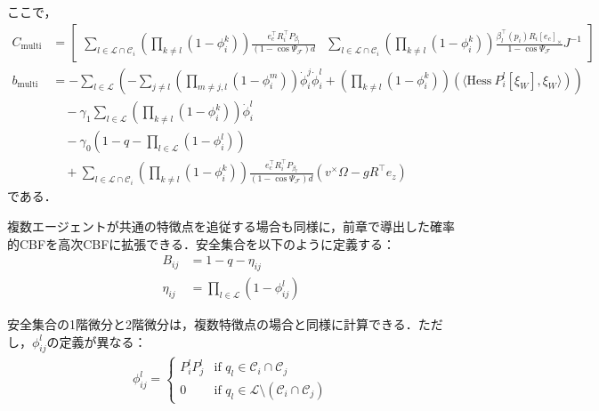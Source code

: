 ここで，
\begin{equation}
\begin{aligned}
C_{\mathrm{multi}} &= \begin{bmatrix}
\sum_{l \in \mathcal{L} \cap \mathcal{C}_i} \left(\prod_{k \neq l} (1 - \phi_i^k)\right) \frac{e_c^\top R_i^\top P_{\beta_l}}{(1 - \cos\Psi_{\mathcal{F}}) d} & \sum_{l \in \mathcal{L} \cap \mathcal{C}_i} \left(\prod_{k \neq l} (1 - \phi_i^k)\right) \frac{\beta_l^\top(p_i) R_i [e_c]_\times}{1 - \cos\Psi_{\mathcal{F}}} J^{-1}
\end{bmatrix} \\
b_{\mathrm{multi}} &= -\sum_{l \in \mathcal{L}} \left(-\sum_{j \neq l} \left(\prod_{m \neq j, l} (1 - \phi_i^m)\right) \dot{\phi}_i^j \dot{\phi}_i^l + \left(\prod_{k \neq l} (1 - \phi_i^k)\right) (\langle \mathrm{Hess}\:P_i^l[\xi_W], \xi_W \rangle)\right) \\
&\quad - \gamma_1 \sum_{l \in \mathcal{L}} \left(\prod_{k \neq l} (1 - \phi_i^k)\right) \dot{\phi}_i^l \\
&\quad - \gamma_0 (1 - q - \prod_{l \in \mathcal{L}} (1 - \phi_i^l)) \\
&\quad + \sum_{l \in \mathcal{L} \cap \mathcal{C}_i} \left(\prod_{k \neq l} (1 - \phi_i^k)\right) \frac{e_c^\top R_i^\top P_{\beta_l}}{(1 - \cos\Psi_{\mathcal{F}}) d} (v^\times \Omega - g R^\top e_z)
\label{eq:multi_hocbf_qp_params}
\end{aligned}
\end{equation}
である．

複数エージェントが共通の特徴点を追従する場合も同様に，前章で導出した確率的CBFを高次CBFに拡張できる．安全集合を以下のように定義する：
\begin{equation}
\begin{aligned}
B_{ij} &= 1 - q - \eta_{ij} \\
\eta_{ij} &= \prod_{l \in \mathcal{L}} (1 - \phi_{ij}^l)
\label{eq:common_hocbf_safe_set}
\end{aligned}
\end{equation}

安全集合の1階微分と2階微分は，複数特徴点の場合と同様に計算できる．ただし，$\phi_{ij}^l$の定義が異なる：
\begin{equation}
\begin{aligned}
\phi_{ij}^l = 
\begin{cases}
P_i^l P_j^l & \text{if } q_l \in \mathcal{C}_i \cap \mathcal{C}_j \\
0 & \text{if } q_l \in \mathcal{L} \setminus (\mathcal{C}_i \cap \mathcal{C}_j)
\end{cases}
\label{eq:common_probability_hocbf}
\end{aligned}
\end{equation}

